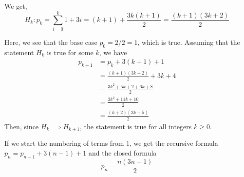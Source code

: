 \begin{questions}
    \begin{solution}
        We get, 
        \begin{equation}
            H_k: p_k = \sum_{i=0}^k{1+3i} = (k+1)+\frac
            {3k(k+1)}{2}=\frac{(k+1)(3k+2)}{2}
        \end{equation}

        Here, we see that the base case $p_0=2/2=1$, which
        is true. Assuming that the statement $H_k$ is true
        for some $k$, we 
        have
        \begin{align*}
            p_{k+1} &= p_k+3(k+1)+1\\
            &=\frac{(k+1)(3k+2)}{2} +3k+4\\
            &=\frac{3k^2+5k+2+6k+8}{2}\\
            &=\frac{3k^2+11k+10}{2}\\
            &=\frac{(k+2)(3k+5)}{2}
        \end{align*}
        Then, since $H_k\implies H_{k+1}$, the statement is
        true for all integers $k\ge 0$.
        \begin{note}
            If we start the numbering of terms from 1, 
            we get the recursive formula $p_n=p_{n-1}+3(n-1)+1$ 
            and the closed formula 
            $$p_n=\frac{n(3n-1)}{2}$$
        \end{note}
    \end{solution}
\end{questions}